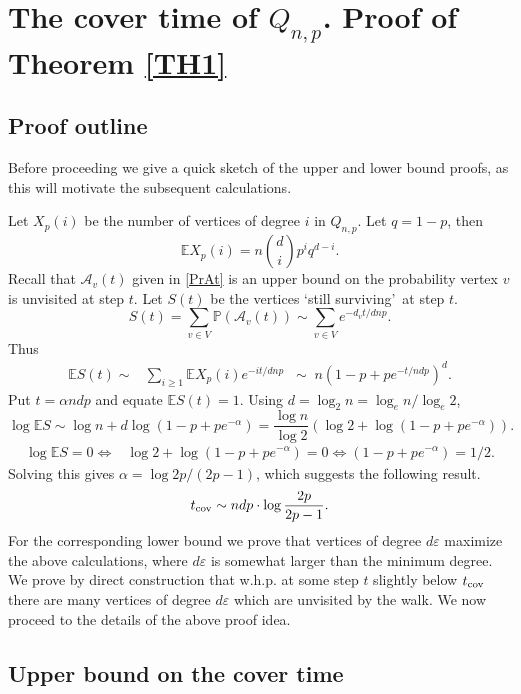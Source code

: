 \documentclass[12pt]{article}
\def\nn{\nonumber}
\def\a{\alpha} \def\b{\beta} \def\d{\delta} \def\D{\Delta}
\def\e{\varepsilon} \def\f{\phi} \def\F{{\Phi}} \def\vp{\varphi} \def\g{\gamma}
\def\E{\mathbb{E}}
\def\Pr{\mathbb{P}}
\def\nn{\nonumber}
\def\tc{t_{\rm cov}}
\begin{document}
\section{The cover time of $Q_{n,p}$. Proof of Theorem \ref{TH1}}

\subsection{Proof outline} \label{Pout}
Before proceeding we give a quick sketch of the upper and lower bound proofs, as this will motivate the subsequent calculations.

Let $X_p(i)$ be the number of vertices of degree $i$ in $Q_{n,p}$. Let $q=1-p$, then
\begin{equation}\label{EXp(i)}
\E X_p(i)=n {d \choose i}p^iq^{d-i}.
\end{equation}
Recall that $\mathcal{A}_v(t)$ given in \eqref{PrAt} is an upper bound on the probability vertex $v$ is unvisited at step $t$. Let $S(t)$ be the vertices \lq still surviving\rq ~at step $t$.
\[
S(t)= \sum_{v \in V} \Pr(\mathcal{A}_v(t))\sim \sum_{v \in V} e^{-d_v t/dnp}.
\]
Thus
\begin{align*}
\E S(t) \sim& \sum_{i \ge 1} \E X_p(i) e^{-it/dnp}\;\;\sim \; n(1-p+pe^{-t/ndp})^d.
\end{align*}
Put $t=\a ndp$ and equate $\E S(t)=1$. Using $d=\log_2 n=\log_e n/\log_e 2$,
\[
\log  \E S \sim \log n+d\log (1-p+pe^{-\a})= \frac{\log n}{\log 2}( \log 2 +\log (1-p+pe^{-\a})).
\]
\begin{align*}
\log \E S=0\iff& \log 2 +\log (1-p+pe^{-\a})=0
\iff (1-p+pe^{-\a})=1/2.
\end{align*}
Solving this gives $ \a = \log {2p}/({2p-1})$, which  suggests the following result.
\begin{equation}%
\tc\sim ndp \cdot \log \frac{2p}{2p-1}. \nn
\end{equation}
For the corresponding lower bound we prove that vertices of degree $d\e$   maximize the above calculations,
where $d\e$ is somewhat larger than the minimum degree.
We  prove by direct construction that w.h.p. at some step $t$ slightly below  $\tc$
there are many vertices of degree $d\e$ which are unvisited by the walk. We now proceed to the details of the above proof idea.
\subsection{Upper bound on the cover time}
\end{document}
